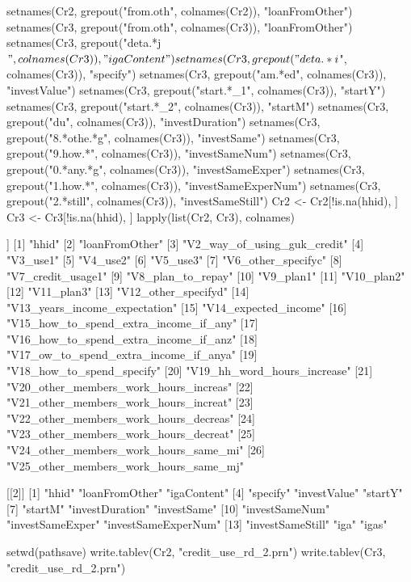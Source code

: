 \begin{Schunk}
\begin{Sinput}
setnames(Cr2, grepout("from.oth", colnames(Cr2)), "loanFromOther")
setnames(Cr3, grepout("from.oth", colnames(Cr3)), "loanFromOther")
setnames(Cr3, grepout("deta.*j$", colnames(Cr3)), "igaContent")
setnames(Cr3, grepout("deta.*i$", colnames(Cr3)), "specify")
setnames(Cr3, grepout("am.*ed", colnames(Cr3)), "investValue")
setnames(Cr3, grepout("start.*_1", colnames(Cr3)), "startY")
setnames(Cr3, grepout("start.*_2", colnames(Cr3)), "startM")
setnames(Cr3, grepout("du", colnames(Cr3)), "investDuration")
setnames(Cr3, grepout("8.*othe.*g", colnames(Cr3)), "investSame")
setnames(Cr3, grepout("9.how.*", colnames(Cr3)), "investSameNum")
setnames(Cr3, grepout("0.*any.*g", colnames(Cr3)), "investSameExper")
setnames(Cr3, grepout("1.how.*", colnames(Cr3)), "investSameExperNum")
setnames(Cr3, grepout("2.*still", colnames(Cr3)), "investSameStill")
Cr2 <- Cr2[!is.na(hhid), ]
Cr3 <- Cr3[!is.na(hhid), ]
lapply(list(Cr2, Cr3), colnames)
\end{Sinput}
\begin{Soutput}
[[1]]
 [1] "hhid"                                
 [2] "loanFromOther"                       
 [3] "V2_way_of_using_guk_credit"          
 [4] "V3_use1"                             
 [5] "V4_use2"                             
 [6] "V5_use3"                             
 [7] "V6_other_specifyc"                   
 [8] "V7_credit_usage1"                    
 [9] "V8_plan_to_repay"                    
[10] "V9_plan1"                            
[11] "V10_plan2"                           
[12] "V11_plan3"                           
[13] "V12_other_specifyd"                  
[14] "V13_years_income_expectation"        
[15] "V14_expected_income"                 
[16] "V15_how_to_spend_extra_income_if_any"
[17] "V16_how_to_spend_extra_income_if_anz"
[18] "V17_ow_to_spend_extra_income_if_anya"
[19] "V18_how_to_spend_specify"            
[20] "V19_hh_word_hours_increase"          
[21] "V20_other_members_work_hours_increas"
[22] "V21_other_members_work_hours_increat"
[23] "V22_other_members_work_hours_decreas"
[24] "V23_other_members_work_hours_decreat"
[25] "V24_other_members_work_hours_same_mi"
[26] "V25_other_members_work_hours_same_mj"

[[2]]
 [1] "hhid"               "loanFromOther"      "igaContent"        
 [4] "specify"            "investValue"        "startY"            
 [7] "startM"             "investDuration"     "investSame"        
[10] "investSameNum"      "investSameExper"    "investSameExperNum"
[13] "investSameStill"    "iga"                "igas"              
\end{Soutput}
\begin{Sinput}
setwd(pathsave)
write.tablev(Cr2, "credit_use_rd_2.prn")
write.tablev(Cr3, "credit_use_rd_2.prn")
\end{Sinput}
\end{Schunk}

